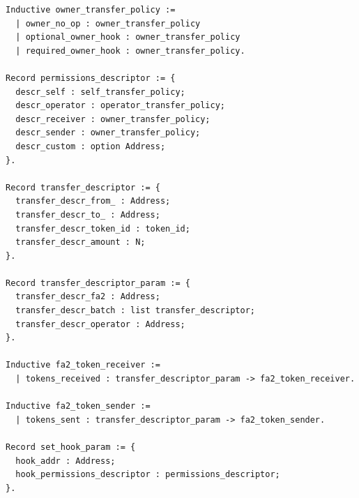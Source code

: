 \documentclass[twoside,11pt,openright]{report}
\newenvironment{code}{\captionsetup{type=figure, singlelinecheck=off, justification=raggedleft}}{}
\begin{document}
\begin{code}
\begin{verbatim}
Inductive owner_transfer_policy :=
  | owner_no_op : owner_transfer_policy
  | optional_owner_hook : owner_transfer_policy
  | required_owner_hook : owner_transfer_policy.

Record permissions_descriptor := {
  descr_self : self_transfer_policy;
  descr_operator : operator_transfer_policy;
  descr_receiver : owner_transfer_policy;
  descr_sender : owner_transfer_policy;
  descr_custom : option Address;
}.

Record transfer_descriptor := {
  transfer_descr_from_ : Address;
  transfer_descr_to_ : Address;
  transfer_descr_token_id : token_id;
  transfer_descr_amount : N;
}.

Record transfer_descriptor_param := {
  transfer_descr_fa2 : Address;
  transfer_descr_batch : list transfer_descriptor;
  transfer_descr_operator : Address;
}.

Inductive fa2_token_receiver :=
  | tokens_received : transfer_descriptor_param -> fa2_token_receiver.

Inductive fa2_token_sender :=
  | tokens_sent : transfer_descriptor_param -> fa2_token_sender.

Record set_hook_param := {
  hook_addr : Address;
  hook_permissions_descriptor : permissions_descriptor;
}.

\end{verbatim}
\end{code}
\end{document}

